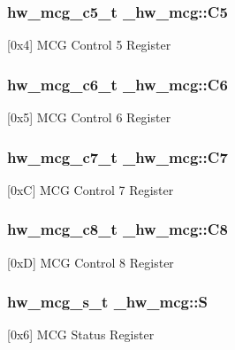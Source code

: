 \subsubsection[{\texorpdfstring{C5}{C5}}]{ {\bf hw\+\_\+mcg\+\_\+c5\+\_\+t} \+\_\+hw\+\_\+mcg\+::\+C5}\hypertarget{struct__hw__mcg_a246c8167c7a24de4150548bb9a118b67}{}\label{struct__hw__mcg_a246c8167c7a24de4150548bb9a118b67}
\mbox{[}0x4\mbox{]} M\+CG Control 5 Register 
\subsubsection[{\texorpdfstring{C6}{C6}}]{ {\bf hw\+\_\+mcg\+\_\+c6\+\_\+t} \+\_\+hw\+\_\+mcg\+::\+C6}\hypertarget{struct__hw__mcg_a9da61d89dc1c5d463e1f164218a2b4a3}{}\label{struct__hw__mcg_a9da61d89dc1c5d463e1f164218a2b4a3}
\mbox{[}0x5\mbox{]} M\+CG Control 6 Register 
\subsubsection[{\texorpdfstring{C7}{C7}}]{ {\bf hw\+\_\+mcg\+\_\+c7\+\_\+t} \+\_\+hw\+\_\+mcg\+::\+C7}\hypertarget{struct__hw__mcg_af69a42a91c944cdb467f91b0afff2ff6}{}\label{struct__hw__mcg_af69a42a91c944cdb467f91b0afff2ff6}
\mbox{[}0xC\mbox{]} M\+CG Control 7 Register 
\subsubsection[{\texorpdfstring{C8}{C8}}]{ {\bf hw\+\_\+mcg\+\_\+c8\+\_\+t} \+\_\+hw\+\_\+mcg\+::\+C8}\hypertarget{struct__hw__mcg_a725495a70c87403fd7d1cdd5187ad585}{}\label{struct__hw__mcg_a725495a70c87403fd7d1cdd5187ad585}
\mbox{[}0xD\mbox{]} M\+CG Control 8 Register 
\subsubsection[{\texorpdfstring{S}{S}}]{ {\bf hw\+\_\+mcg\+\_\+s\+\_\+t} \+\_\+hw\+\_\+mcg\+::S}\hypertarget{struct__hw__mcg_a8d3d2d125103dcbeef3d49aa735205b9}{}\label{struct__hw__mcg_a8d3d2d125103dcbeef3d49aa735205b9}
\mbox{[}0x6\mbox{]} M\+CG Status Register 
